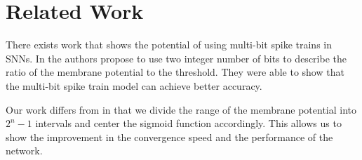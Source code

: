\chapter{Related Work}
\label{chap:related}

There exists work that shows the potential of using multi-bit spike trains in SNNs. In \cite{xiao2024multibitmechanismnovelinformation} the authors propose to use two integer number of bits to describe the ratio of the membrane potential to the threshold. They were able to show that the multi-bit spike train model can achieve better accuracy. 

Our work differs from \cite{xiao2024multibitmechanismnovelinformation} in that we divide the range of the membrane potential into $2^n-1$ intervals and center the sigmoid function accordingly. This allows us to show the improvement in the convergence speed and the performance of the network.